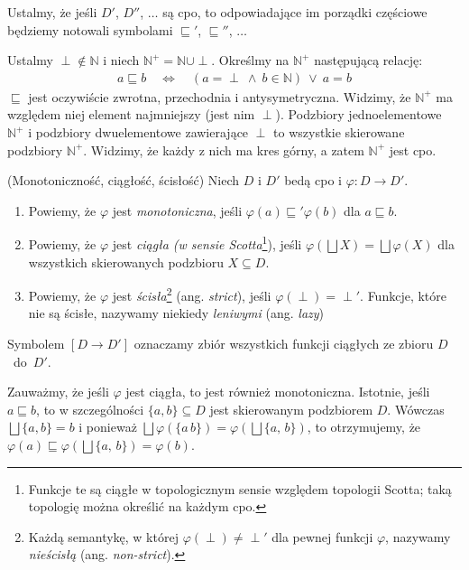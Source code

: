 Ustalmy, że jeśli \(D'\), \(D''\), \(\dots\)  są cpo, to odpowiadające im porządki częściowe będziemy notowali symbolami \(\sqsubseteq'\), \(\sqsubseteq''\), \(\dots\)

\begin{przyklad}\label{ex:scott_d0}
  Ustalmy \(\perp\not\in \mathbb{N}\) i niech \(\mathbb{N}^{+}=\mathbb{N}\cup{\perp}\). Określmy na \(\mathbb{N}^+\) następującą relację:
  \begin{align*}
    a \sqsubseteq b \quad \Leftrightarrow\quad (a=\perp\ \land\ b\in \mathbb{N})\ \lor\ a = b
  \end{align*}
  \(\sqsubseteq\) jest oczywiście zwrotna, przechodnia i antysymetryczna. Widzimy, że \(\mathbb{N}^{+}\) ma względem niej element najmniejszy (jest nim  \(\perp\)). Podzbiory jednoelementowe \(\mathbb{N}^{+}\) i podzbiory dwuelementowe zawierające \(\perp\) to wszystkie skierowane podzbiory \(\mathbb{N}^{+}\). Widzimy, że każdy z nich ma kres górny, a zatem \(\mathbb{N}^{+}\) jest cpo.
\end{przyklad}

\begin{definicja}(Monotoniczność, ciągłość, ścisłość)\label{def:m_cont} %
Niech \(D\) i \(D'\) bedą cpo i \(\varphi: D\to D'\).
\begin{enumerate}[label={(\alph*)}, ref={(\alph*)}] 
  \setlength\itemsep{0em}
\item Powiemy, że \(\varphi\) jest \emph{monotoniczna}, jeśli \(\varphi(a) \sqsubseteq' \varphi(b)\) dla \(a\sqsubseteq b\).
\item Powiemy, że \(\varphi\) jest \emph{ciągła (w sensie Scotta}\footnote{Funkcje te są ciągłe w topologicznym sensie względem topologii Scotta; taką topologię można określić na każdym cpo.}), jeśli \(\varphi(\bigsqcup X) = \bigsqcup \varphi (X)\) dla wszystkich skierowanych podzbioru \(X\subseteq D\).\label{def:m_cont_2}
\item Powiemy, że \(\varphi\) jest \emph{ścisła}\footnote{Każdą semantykę, w której \(\varphi(\perp)\neq\perp'\) dla pewnej funkcji \(\varphi\), nazywamy \emph{nieścisłą} (ang. \emph{non-strict}).} 
 (ang. \emph{strict}), jeśli \(\varphi(\perp)=\perp'\). Funkcje, które nie są ścisłe, nazywamy niekiedy \emph{leniwymi} (ang. \emph{lazy})\end{enumerate}
Symbolem \([D\to D']\) oznaczamy zbiór wszystkich funkcji ciągłych ze zbioru \(D\)~do~\(D'\).
\end{definicja}

\begin{uwaga*}
Zauważmy, że jeśli \(\varphi\) jest ciągła, to jest również monotoniczna. Istotnie, jeśli \(a\sqsubseteq b\), to w szczególności \(\{a, b\}\subseteq D\) jest skierowanym podzbiorem \(D\). Wówczas \(\bigsqcup\{a, b\}=b\) i ponieważ \(\bigsqcup \varphi(\{a\,b\})=\varphi(\bigsqcup\{a,\,b\})\), to otrzymujemy, że \(\varphi(a)\sqsubseteq \varphi(\bigsqcup\{a,\,b\}) = \varphi(b)\).
\end{uwaga*}

